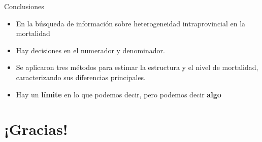 \documentclass[10pt,ignorenonframetext,]{beamer}
\providecommand{\tightlist}{%
  \setlength{\itemsep}{0pt}\setlength{\parskip}{0pt}}
\begin{document}
\begin{frame}{Conclusiones}

\begin{itemize}[<+->]
\tightlist
\item
  En la búsqueda de información sobre heterogeneidad intraprovincial en
  la mortalidad
\item
  Hay decisiones en el numerador y denominador.
\item
  Se aplicaron tres métodos para estimar la estructura y el nivel de
  mortalidad, caracterizando sus diferencias principales.
\item
  Hay un \textbf{límite} en lo que podemos decir, pero podemos decir
  \textbf{algo}
\end{itemize}

\end{frame}

\section{¡Gracias!}\label{gracias}
\end{document}
